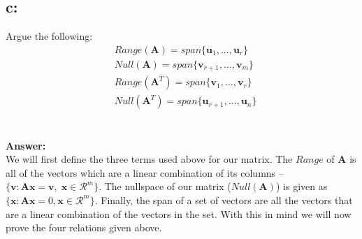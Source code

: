 \documentclass[]{article}
\begin{document}
	\subsection*{c:}
	Argue the following:
	\begin{align*}
		&Range(\mathbf{A})=span\{\mathbf{u}_1,...,\mathbf{u}_r\}\\
		&Null(\mathbf{A})=span\{\mathbf{v}_{r+1},...,\mathbf{v}_m\}\\
		&Range(\mathbf{A}^T)=span\{\mathbf{v}_1,...,\mathbf{v}_r\}\\
		&Null(\mathbf{A}^T)=span\{\mathbf{u}_{r+1},...,\mathbf{u}_n\}
	\end{align*}
	\\~\\
	\textbf{Answer:}\\
	We will first define the three terms used above for our matrix. The $Range$ of $\mathbf{A}$ is all of the vectors which are a linear combination of its columns -- $\{\mathbf{v}:\mathbf{Ax}=\mathbf{v},\;\mathbf{x}\in\mathcal{R}^m\}$. The nullspace of our matrix ($Null(\mathbf{A})$) is given as $\{\mathbf{x}:\mathbf{Ax}=0,\mathbf{x}\in\mathcal{R}^m\}$. Finally, the span of a set of vectors are all the vectors that are a linear combination of the vectors in the set. With this in mind we will now prove the four relations given above.
\end{document}
